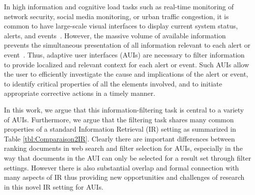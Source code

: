 In high information and cognitive load tasks such as real-time monitoring of network security, social media monitoring, or urban traffic congestion, it is common to have large-scale visual interfaces to display current system status, alerts, and events~\cite{Landesberger2011,Liu2014,Sun2013}. However, the massive volume of available information prevents the simultaneous presentation of all information relevant to each alert or event~\cite{Liu2014}. Thus, adaptive user interfaces (AUIs) are necessary to filter information to provide localized and relevant context for each alert or event.  
Such AUIs allow the user to efficiently investigate the cause and implications of the alert or event, to identify critical properties of all the elements involved, and to initiate appropriate corrective actions in a timely manner.

In this work, we argue that this information-filtering task is central to a variety of AUIs.  Furthermore, we argue that the filtering task shares many common properties of a standard Information Retrieval (IR) setting as summarized in Table \ref{tbl:Comparaison2IR}.  Clearly there are important differences between ranking documents in web search and filter selection for AUIs, especially in the way that documents in the AUI can only be selected for a result set through filter settings.
However there is also substantial overlap and formal connection with many aspects of IR thus providing   
new opportunities and challenges of research in this novel IR setting for AUIs.




